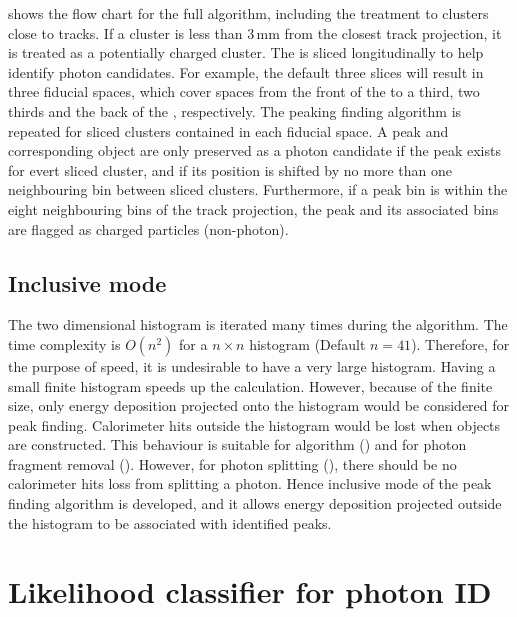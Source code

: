  shows the flow chart for the full \peakFinding algorithm, including the treatment to clusters close to tracks. If a cluster is less than 3\,mm from the closest track projection, it is treated as a potentially charged cluster. The \ECAL is sliced longitudinally to help identify photon candidates. For example, the default three slices will result in three \ECAL fiducial spaces, which cover spaces from the front of the \ECAL to a third, two thirds and the back of the \ECAL, respectively. The peaking finding algorithm is repeated for sliced clusters contained in each fiducial space. A peak and corresponding \ShowerPeak object  are only preserved as a photon candidate if the peak exists for evert sliced cluster, and if its position is shifted by no more than one neighbouring bin between sliced clusters. Furthermore, if a peak bin is within the eight neighbouring bins of the track projection, the peak and its associated bins are flagged as charged particles (non-photon).

\subsection{Inclusive mode}
\label{sec:photonPeakFindingInclusive}

The two dimensional histogram is iterated many times during the algorithm. The time complexity is $O(n^2)$ for a $n \times n$ histogram (Default $n = 41$). Therefore, for the purpose of speed, it is undesirable to have a very large histogram. Having a small finite histogram speeds up the calculation. However, because of the finite size, only energy deposition projected onto the histogram would be considered for peak finding. Calorimeter hits outside the histogram would be lost when \ShowerPeak objects are constructed. This behaviour is suitable for \PhotonReconstruction algorithm () and for photon fragment removal (). However, for photon splitting (), there should be no calorimeter hits loss from splitting a photon. Hence inclusive mode of the peak finding algorithm is developed, and it allows energy deposition projected outside the histogram to be associated with identified peaks.


\section{Likelihood classifier for photon ID}
\label{sec:photonLikelihood}

